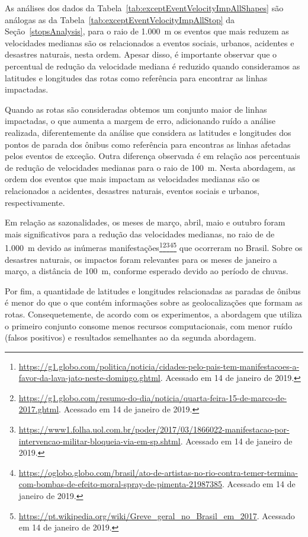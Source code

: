 \documentclass[
	12pt,				%
	oneside,			%
	a4paper,			%
	english,			%
	brazil				%
	]{abntex2ppgsi}
\begin{document}
{{{As análises dos dados da Tabela~\ref{tab:exceptEventVelocityImpAllShapes} são análogas as da Tabela~\ref{tab:exceptEventVelocityImpAllStop} da Seção~\ref{stopsAnalysis}, para o raio de 1.000~m os eventos que mais reduzem as velocidades medianas são os relacionados a eventos sociais, urbanos, acidentes e desastres naturais, nesta ordem. Apesar disso, é importante observar que o percentual de redução da velocidade mediana é reduzido quando consideramos as latitudes e longitudes das rotas como referência para encontrar as linhas impactadas. 

Quando as rotas são consideradas obtemos um conjunto maior de linhas impactadas, o que aumenta a margem de erro, adicionando ruído a análise realizada, diferentemente da análise que considera as latitudes e longitudes dos pontos de parada dos ônibus como referência para encontras as linhas afetadas pelos eventos de exceção. Outra diferença observada é em relação aos percentuais de redução de velocidades medianas para o raio de 100~m. Nesta abordagem, as ordem dos eventos que mais impactam as velocidades medianas são os relacionados a acidentes, desastres naturais, eventos sociais e urbanos, respectivamente.

Em relação as sazonalidades, os meses de  março, abril, maio e outubro foram mais significativos para a redução das velocidades medianas, no raio de de 1.000~m devido as inúmeras manifestações\footnote{\url{https://g1.globo.com/politica/noticia/cidades-pelo-pais-tem-manifestacoes-a-favor-da-lava-jato-neste-domingo.ghtml}. Acessado em 14 de janeiro de 2019.}\footnote{\url{https://g1.globo.com/resumo-do-dia/noticia/quarta-feira-15-de-marco-de-2017.ghtml}. Acessado em 14 de janeiro de 2019.}\footnote{\url{https://www1.folha.uol.com.br/poder/2017/03/1866022-manifestacao-por-intervencao-militar-bloqueia-via-em-sp.shtml}. Acessado em 14 de janeiro de 2019.}\footnote{\url{https://oglobo.globo.com/brasil/ato-de-artistas-no-rio-contra-temer-termina-com-bombas-de-efeito-moral-spray-de-pimenta-21987385}. Acessado em 14 de janeiro de 2019.}\footnote{\url{https://pt.wikipedia.org/wiki/Greve\_geral\_no\_Brasil\_em\_2017}. Acessado em 14 de janeiro de 2019.} que ocorreram no Brasil. Sobre os desastres naturais, os impactos foram relevantes para os meses de janeiro a março, a distância de 100~m, conforme esperado devido ao período de chuvas.

Por fim, a quantidade de latitudes e longitudes relacionadas as paradas de ônibus é menor do que o que contém informações sobre as geolocalizações que formam as rotas. Consequetemente, de acordo com os experimentos, a abordagem que utiliza o primeiro conjunto consome menos recursos computacionais, com menor ruído (falsos positivos) e resultados semelhantes ao da segunda abordagem.

}}}
\end{document}

